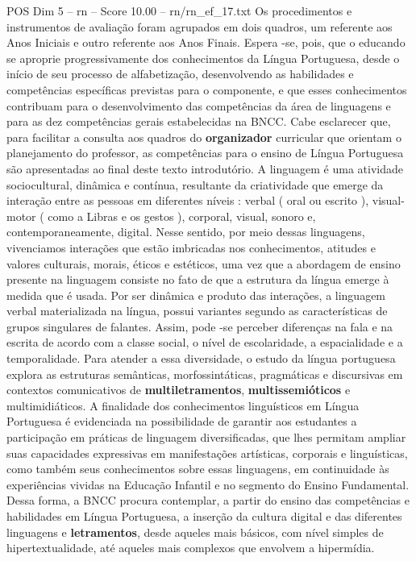 \begin{textsample}{POS Dim 5 – rn – Score 10.00 – rn/rn\_ef\_17.txt}
Os procedimentos e instrumentos de avaliação foram agrupados em dois quadros, um referente aos Anos Iniciais e outro referente aos Anos Finais.
Espera -se, pois, que o educando se aproprie progressivamente dos conhecimentos da Língua Portuguesa, desde o início de seu processo de alfabetização, desenvolvendo as habilidades e competências específicas previstas para o componente, e que esses conhecimentos contribuam para o desenvolvimento das competências da área de linguagens e para as dez competências gerais estabelecidas na BNCC.
Cabe esclarecer que, para facilitar a consulta aos quadros do \textbf{organizador} curricular que orientam o planejamento do professor, as competências para o ensino de Língua Portuguesa são apresentadas ao final deste texto introdutório.
A linguagem é uma atividade sociocultural, dinâmica e contínua, resultante da criatividade que emerge da interação entre as pessoas em diferentes níveis : verbal ( oral ou escrito ), visual-motor ( como a Libras e os gestos ), corporal, visual, sonoro e, contemporaneamente, digital.
Nesse sentido, por meio dessas linguagens, vivenciamos interações que estão imbricadas nos conhecimentos, atitudes e valores culturais, morais, éticos e estéticos, uma vez que a abordagem de ensino presente na linguagem consiste no fato de que a estrutura da língua emerge à medida que é usada.
Por ser dinâmica e produto das interações, a linguagem verbal materializada na língua, possui variantes segundo as características de grupos singulares de falantes.
Assim, pode -se perceber diferenças na fala e na escrita de acordo com a classe social, o nível de escolaridade, a espacialidade e a temporalidade.
Para atender a essa diversidade, o estudo da língua portuguesa explora as estruturas semânticas, morfossintáticas, pragmáticas e discursivas em contextos comunicativos de \textbf{multiletramentos}, \textbf{multissemióticos} e multimidiáticos.
A finalidade dos conhecimentos linguísticos em Língua Portuguesa é evidenciada na possibilidade de garantir aos estudantes a participação em práticas de linguagem diversificadas, que lhes permitam ampliar suas capacidades expressivas em manifestações artísticas, corporais e linguísticas, como também seus conhecimentos sobre essas linguagens, em continuidade às experiências vividas na Educação Infantil e no segmento do Ensino Fundamental.
Dessa forma, a BNCC procura contemplar, a partir do ensino das competências e habilidades em Língua Portuguesa, a inserção da cultura digital e das diferentes linguagens e \textbf{letramentos}, desde aqueles mais básicos, com nível simples de hipertextualidade, até aqueles mais complexos que envolvem a hipermídia.

\end{textsample}
